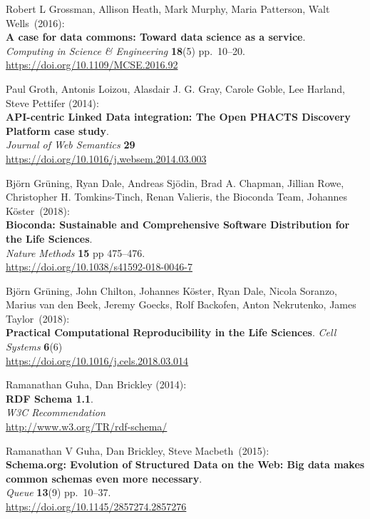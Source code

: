 \begin{thebibliography}{9}
Robert L Grossman, Allison Heath, Mark Murphy, Maria Patterson,
Walt Wells~(2016):\\
\textbf{A case for data commons: Toward data science as a service}.\\
\emph{Computing in Science \& Engineering} \textbf{18}(5) pp.~10--20.\\
\url{https://doi.org/10.1109/MCSE.2016.92}

Paul Groth, Antonis Loizou, Alasdair J. G. Gray, Carole Goble, Lee
Harland, Steve Pettifer (2014): \\
\textbf{API-centric Linked Data integration: {The Open PHACTS Discovery Platform} case study}.\\
\emph{Journal of Web Semantics} \textbf{29} \\
\url{https://doi.org/10.1016/j.websem.2014.03.003}

Björn Grüning, Ryan Dale, Andreas Sjödin, Brad A. Chapman,
Jillian Rowe, Christopher H. Tomkins-Tinch, Renan Valieris, the Bioconda
Team, Johannes Köster~(2018):\\
\textbf{Bioconda: Sustainable and Comprehensive Software Distribution
for the Life Sciences}.\\
\emph{Nature Methods} \textbf{15} pp 475--476.\\
\url{https://doi.org/10.1038/s41592-018-0046-7}

Björn Grüning, John Chilton, Johannes Köster, Ryan Dale, Nicola
Soranzo, Marius van den Beek, Jeremy Goecks, Rolf Backofen, Anton
Nekrutenko, James Taylor~(2018):\\
\textbf{Practical Computational Reproducibility in the Life Sciences}.
\emph{Cell Systems} \textbf{6}(6)\\
\url{https://doi.org/10.1016/j.cels.2018.03.014}

Ramanathan Guha, Dan Brickley (2014): \\
\textbf{RDF Schema 1.1}.\\
\emph{W3C Recommendation} \\
\url{http://www.w3.org/TR/rdf-schema/}

Ramanathan V Guha, Dan Brickley, Steve Macbeth~(2015):\\
\textbf{Schema.org: Evolution of Structured Data on the Web: Big data
makes common schemas even more necessary}.\\
\emph{Queue} \textbf{13}(9) pp.~10--37.\\
\url{https://doi.org/10.1145/2857274.2857276}


\end{thebibliography}
